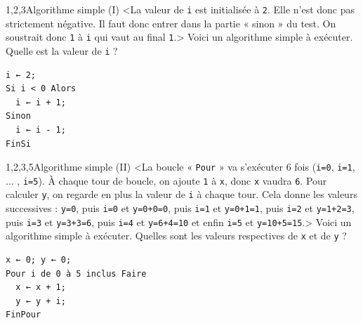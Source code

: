 \begin{quiz}[title={Instructions élémentaires}]
\vspace{-\baselineskip}
\begin{quizquestion*}[b]{4}{1,2,3}{Algorithme simple (I)}
<La valeur de \texttt{i} est initialisée à \texttt{2}. Elle n'est donc pas strictement négative. Il faut donc entrer dans la partie « sinon » du test. On soustrait donc \texttt{1} à \texttt{i} qui vaut au final \texttt{1}.>
Voici un algorithme simple à exécuter. Quelle est la valeur de \texttt{i} ?
\begin{lstlisting}[style=lstalgostyle]
i ← 2;
Si i < 0 Alors
  i ← i + 1;
Sinon
  i ← i - 1;
FinSi
\end{lstlisting}
\end{quizquestion*}

\vfill\pagebreak

\begin{quizquestion*}[b]{4}{1,2,3,5}{Algorithme simple (II)}
<La boucle « \texttt{Pour} » va s'exécuter 6 fois (\texttt{i=0}, \texttt{i=1}, ... , \texttt{i=5}). À chaque tour de boucle, on ajoute \texttt{1} à \texttt{x}, donc \texttt{x} vaudra \texttt{6}.
Pour calculer \texttt{y}, on regarde en plus la valeur de \texttt{i} à chaque tour. Cela donne les valeurs successives : \texttt{y=0}, puis \texttt{i=0} et \texttt{y=0+0=0}, puis \texttt{i=1} et \texttt{y=0+1=1}, puis \texttt{i=2} et \texttt{y=1+2=3}, puis \texttt{i=3} et \texttt{y=3+3=6}, puis \texttt{i=4} et \texttt{y=6+4=10} et enfin \texttt{i=5} et \texttt{y=10+5=15}.>
Voici un algorithme simple à exécuter. Quelles sont les valeurs respectives de \texttt{x} et de \texttt{y} ?	
\begin{lstlisting}[style=lstalgostyle]
x ← 0; y ← 0;
Pour i de 0 à 5 inclus Faire
  x ← x + 1;
  y ← y + i;
FinPour
\end{lstlisting}
\end{quizquestion*}


\end{quiz}
